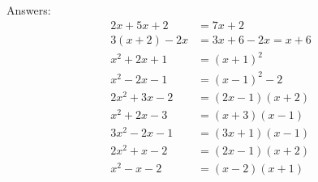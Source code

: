 \documentclass{article}
\begin{document}
Answers:
\begin{align*}
2x + 5x + 2 &= 7x + 2 \\
3(x + 2) - 2x &= 3x + 6 - 2x = x + 6 \\
x^2 + 2x + 1 &= (x + 1)^2 \\
x^2 - 2x - 1 &= (x - 1)^2 - 2 \\
2x^2 + 3x - 2 &= (2x - 1)(x + 2) \\
x^2 + 2x - 3 &= (x + 3)(x - 1) \\
3x^2 - 2x - 1 &= (3x + 1)(x - 1) \\
2x^2 + x - 2 &= (2x - 1)(x + 2) \\
x^2 - x - 2 &= (x - 2)(x + 1) \\
\end{align*}
\end{document}
